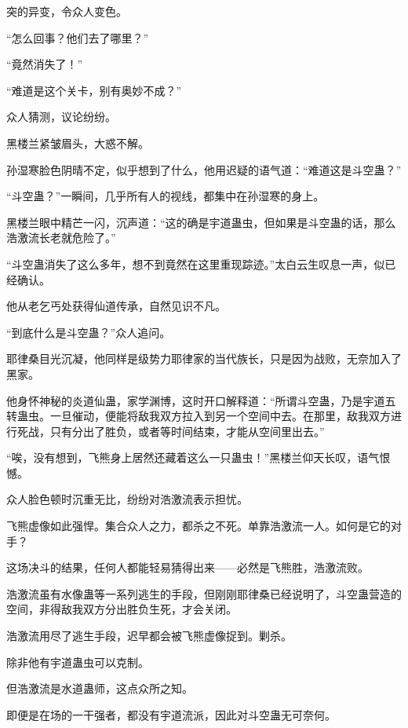 
\begin{this_body}

突的异变，令众人变色。

“怎么回事？他们去了哪里？”

“竟然消失了！”

“难道是这个关卡，别有奥妙不成？”

众人猜测，议论纷纷。

黑楼兰紧皱眉头，大惑不解。

孙湿寒脸色阴晴不定，似乎想到了什么，他用迟疑的语气道：“难道这是斗空蛊？”

“斗空蛊？”一瞬间，几乎所有人的视线，都集中在孙湿寒的身上。

黑楼兰眼中精芒一闪，沉声道：“这的确是宇道蛊虫，但如果是斗空蛊的话，那么浩激流长老就危险了。”

“斗空蛊消失了这么多年，想不到竟然在这里重现踪迹。”太白云生叹息一声，似已经确认。

他从老乞丐处获得仙道传承，自然见识不凡。

“到底什么是斗空蛊？”众人追问。

耶律桑目光沉凝，他同样是级势力耶律家的当代族长，只是因为战败，无奈加入了黑家。

他身怀神秘的炎道仙蛊，家学渊博，这时开口解释道：“所谓斗空蛊，乃是宇道五转蛊虫。一旦催动，便能将敌我双方拉入到另一个空间中去。在那里，敌我双方进行死战，只有分出了胜负，或者等时间结束，才能从空间里出去。”

“唉，没有想到，飞熊身上居然还藏着这么一只蛊虫！”黑楼兰仰天长叹，语气恨憾。

众人脸色顿时沉重无比，纷纷对浩激流表示担忧。

飞熊虚像如此强悍。集合众人之力，都杀之不死。单靠浩激流一人。如何是它的对手？

这场决斗的结果，任何人都能轻易猜得出来——必然是飞熊胜，浩激流败。

浩激流虽有水像蛊等一系列逃生的手段，但刚刚耶律桑已经说明了，斗空蛊营造的空间，非得敌我双方分出胜负生死，才会关闭。

浩激流用尽了逃生手段，迟早都会被飞熊虚像捉到。剿杀。

除非他有宇道蛊虫可以克制。

但浩激流是水道蛊师，这点众所之知。

即便是在场的一干强者，都没有宇道流派，因此对斗空蛊无可奈何。


\end{this_body}
